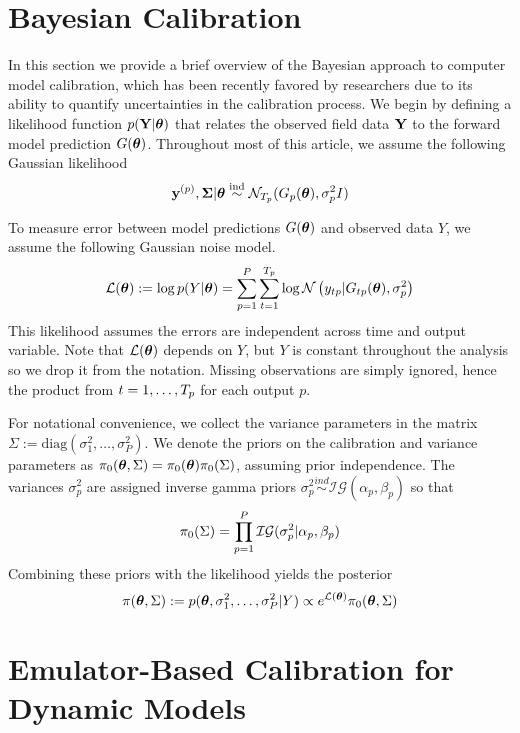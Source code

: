 \documentclass[12pt]{article}
\begin{document}
\section{Bayesian Calibration}
In this section we provide a brief overview of the Bayesian approach to computer model calibration, which has been recently favored by researchers due to its ability to quantify 
uncertainties in the calibration process. We begin by defining a likelihood function $p(\mathbf{Y}|\boldsymbol{\theta})$ that relates the observed field data $\mathbf{Y}$ to the forward model prediction 
$G(\boldsymbol{\theta})$. Throughout most of this article, we assume the following Gaussian likelihood 
\begin{align}
\mathbf{y}^{(p)}, \boldsymbol{\Sigma} | \boldsymbol{\theta} \overset{\text{ind}}{\sim} \mathcal{N}_{T_{p}}(G_{p}(\boldsymbol{\theta}), \sigma_{p}^2 I)
\end{align}




To measure error between model 
predictions $G(\boldsymbol{\theta})$ and observed data $Y$, we assume the following Gaussian noise model. 
\begin{align*}
\mathcal{L}(\boldsymbol{\theta}) := \log p(Y|\mathbf{\boldsymbol{\theta}}) = \sum_{p = 1}^{P} \sum_{t = 1}^{T_{p}} \log \mathcal{N}\left(y_{tp}| G_{tp}(\boldsymbol{\theta}), \sigma_p^2 \right)
\end{align*}
This likelihood assumes the errors are independent across time and output variable. Note that $\mathcal{L}(\boldsymbol{\theta})$ depends on $Y$, but $Y$ is constant throughout the analysis so we drop it from the notation. Missing 
observations are simply ignored, hence the product from $t = 1, \dots, T_{p}$ for each output $p$.

For notational convenience, we collect the variance parameters in the matrix $\Sigma := \text{diag}\left(\sigma_1^2, \dots, \sigma_P^2 \right)$. 
We denote the priors on the calibration and variance parameters as  $\pi_0(\boldsymbol{\theta}, \Sigma) = \pi_0(\boldsymbol{\theta})\pi_0(\Sigma)$, assuming prior independence.  
The variances $\sigma_p^2$ are assigned inverse gamma priors $\sigma_p^2 \overset{ind}{\sim} \mathcal{IG}(\alpha_p, \beta_p)$ so that 
\[\pi_0(\Sigma) = \prod_{p = 1}^{P} \mathcal{IG}(\sigma_p^2|\alpha_p, \beta_p)\]
Combining these priors with the likelihood yields the posterior 
\[\pi(\boldsymbol{\theta}, \Sigma) := p(\boldsymbol{\theta}, \sigma_1^2, \dots, \sigma_P^2|Y) \propto e^{\mathcal{L}(\boldsymbol{\theta})}\pi_0(\boldsymbol{\theta}, \Sigma)\]


\section{Emulator-Based Calibration for Dynamic Models}
\end{document}

